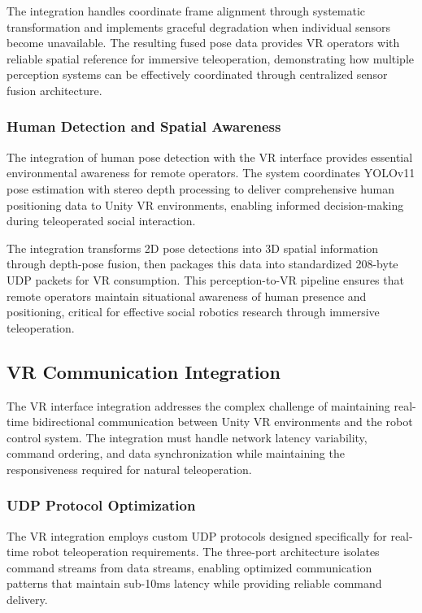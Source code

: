 The integration handles coordinate frame alignment through systematic transformation and implements graceful degradation when individual sensors become unavailable. The resulting fused pose data provides VR operators with reliable spatial reference for immersive teleoperation, demonstrating how multiple perception systems can be effectively coordinated through centralized sensor fusion architecture.

\subsubsection{Human Detection and Spatial Awareness}

The integration of human pose detection with the VR interface provides essential environmental awareness for remote operators. The system coordinates YOLOv11 pose estimation with stereo depth processing to deliver comprehensive human positioning data to Unity VR environments, enabling informed decision-making during teleoperated social interaction.

The integration transforms 2D pose detections into 3D spatial information through depth-pose fusion, then packages this data into standardized 208-byte UDP packets for VR consumption. This perception-to-VR pipeline ensures that remote operators maintain situational awareness of human presence and positioning, critical for effective social robotics research through immersive teleoperation.

\subsection{VR Communication Integration}

The VR interface integration addresses the complex challenge of maintaining real-time bidirectional communication between Unity VR environments and the robot control system. The integration must handle network latency variability, command ordering, and data synchronization while maintaining the responsiveness required for natural teleoperation.

\subsubsection{UDP Protocol Optimization}

The VR integration employs custom UDP protocols designed specifically for real-time robot teleoperation requirements. The three-port architecture isolates command streams from data streams, enabling optimized communication patterns that maintain sub-10ms latency while providing reliable command delivery.

